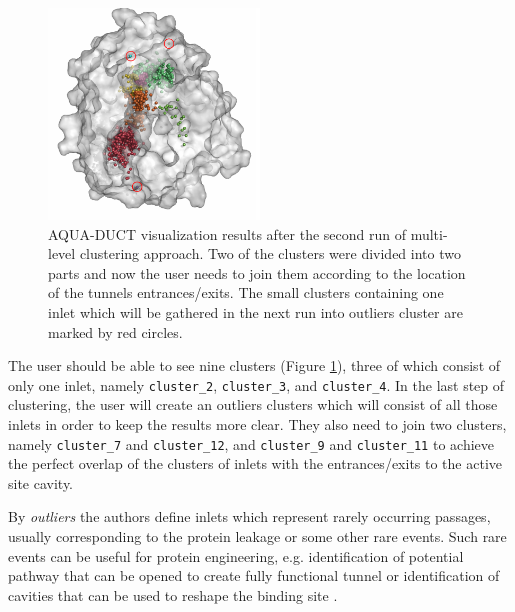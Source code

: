 \documentclass[9pt,tutorial]{livecoms}
\begin{document}
\begin{figure}[ht!]
\centering
\includegraphics[width=0.5\textwidth]{Tut2.2.png}
\caption{AQUA-DUCT visualization results after the second run of multi-level clustering approach. Two of the clusters were divided into two parts and now the user needs to join them according to the location of the tunnels entrances/exits. The small clusters containing one inlet which will be gathered in the next run into outliers cluster are marked by red circles.}
\label{Tut2.2}
\end{figure}

The user should be able to see nine clusters (Figure \ref{Tut2.2}), three of which consist of only one inlet, namely \texttt{cluster\_2}, \texttt{cluster\_3}, and \texttt{cluster\_4}. In the last step of clustering, the user will create an outliers clusters which will consist of all those inlets in order to keep the results more clear. They also need to join two clusters, namely \texttt{cluster\_7} and \texttt{cluster\_12}, and \texttt{cluster\_9} and \texttt{cluster\_11} to achieve the perfect overlap of the clusters of inlets with the entrances/exits to the active site cavity.

By \textit{outliers} the authors define inlets which represent rarely occurring passages, usually corresponding to the protein leakage or some other rare events. Such rare events can be useful for protein engineering, e.g. identification of potential pathway that can be opened to create fully functional tunnel \cite{Magdziarz2020,Brezovsky2016} or identification of cavities that can be used to reshape the binding site \cite{Mitusinska2018}.
\end{document}
